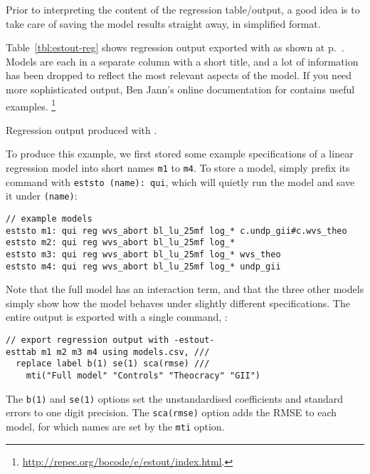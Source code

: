 Prior to interpreting the content of the regression table/output, a good idea is to take care of saving the model results straight away, in simplified format.

Table~\ref{tbl:estout-reg} shows regression output exported with  as shown at p.~\pageref{tbl:hibbs_yx1_estout}. Models are each in a separate column with a short title, and a lot of information has been dropped to reflect the most relevant aspects of the model. If you need more sophisticated output, Ben Jann's online documentation for  contains useful examples.%
\footnote{\url{http://repec.org/bocode/e/estout/index.html}.}


\begin{fullwidth}
	\begin{table}
		\footnotesize
    
		\caption{Regression output produced with .}
		\label{tbl:estout-reg}
	\end{table}
\end{fullwidth}

To produce this example, we first stored some example specifications of a linear regression model into short names \texttt{m1} to \texttt{m4}. To store a model, simply prefix its command with \texttt{eststo (name): qui}, which will quietly run the model and save it under \texttt{(name)}:

\begin{verbatim}
// example models
eststo m1: qui reg wvs_abort bl_lu_25mf log_* c.undp_gii#c.wvs_theo
eststo m2: qui reg wvs_abort bl_lu_25mf log_*
eststo m3: qui reg wvs_abort bl_lu_25mf log_* wvs_theo
eststo m4: qui reg wvs_abort bl_lu_25mf log_* undp_gii
\end{verbatim}

Note that the full model has an interaction term, and that the three other models simply show how the model behaves under slightly different specifications. The entire output is exported with a single command, :

\begin{verbatim}
// export regression output with -estout-
esttab m1 m2 m3 m4 using models.csv, ///
  replace label b(1) se(1) sca(rmse) ///
	mti("Full model" "Controls" "Theocracy" "GII")
\end{verbatim}

The \texttt{b(1)} and \texttt{se(1)} options set the unstandardised coefficients and standard errors to one digit precision. The \texttt{sca(rmse)} option adds the RMSE to each model, for which names are set by the \texttt{mti} option.
